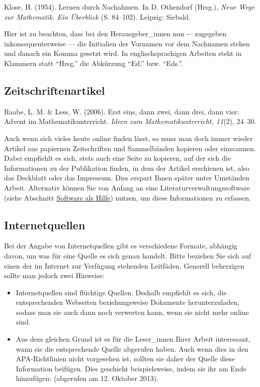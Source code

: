 \documentclass[
  bibliography=totoc,
  oneside,
  12pt,
  a4paper]{scrbook}
\begin{document}
Klose, H. (1954). Lernen durch Nachahmen. In D. Othendorf (Hrsg.), \emph{Neue
Wege zur Mathematik. Ein Überblick} (S. 84--102). Leipzig: Siebald.

Hier ist zu beachten, dass bei den Herausgeber\_innen nun -\/-- zugegeben
inkonsequenterweise --- die Initialien der Vornamen vor dem Nachnamen
stehen und danach ein Komma gesetzt wird. In englischsprachigen Arbeiten
steht in Klammern statt ``Hrsg.'' die Abkürzung ``Ed.'' bzw. ``Eds.''.

\hypertarget{zeitschriftenartikel}{%
\subsection*{Zeitschriftenartikel}\label{zeitschriftenartikel}}

Raabe, L. M. \& Less, W. (2006). Erst eins, dann zwei, dann drei, dann
vier: Advent im Mathematikunterricht. \emph{Ideen zum Mathematikunterricht,
11}(2), 24--30.

Auch wenn sich vieles heute online finden lässt, so muss man doch immer
wieder Artikel aus papiernen Zeitschriften und Sammelbänden kopieren
oder einscannen. Dabei empfiehlt es sich, stets auch eine Seite zu
kopieren, auf der sich die Informationen zu der Publikation finden, in
dem der Artikel erschienen ist, also das Deckblatt oder das Impressum.
Dies erspart Ihnen später unter Umständen Arbeit. Alternativ können Sie
von Anfang an eine Literaturverwaltungssoftware (siehe
Abschnitt \protect\hyperlink{sec:software}{Software als Hilfe}) nutzen, um diese Informationen zu erfassen.

\hypertarget{internetquellen}{%
\subsection*{Internetquellen}\label{internetquellen}}

Bei der Angabe von Internetquellen gibt es verschiedene Formate,
abhängig davon, um was für eine Quelle es sich genau handelt. Bitte
beziehen Sie sich auf einen der im Internet zur Verfügung stehenden
Leitfäden. Generell beherzigen sollte man jedoch zwei Hinweise:

\begin{itemize}
\item
  Internetquellen sind flüchtige Quellen. Deshalb empfiehlt es sich,
  die entsprechenden Webseiten beziehungsweise Dokumente
  herunterzuladen, sodass man sie auch dann noch verwerten kann, wenn
  sie nicht mehr online sind.
\item
  Aus dem gleichen Grund ist es für die Leser\_innen Ihrer Arbeit
  interessant, wann sie die entsprechende Quelle abgerufen haben. Auch
  wenn dies in den APA-Richtlinien nicht vorgesehen ist, sollten sie
  daher der Quelle diese Information beifügen. Dies geschieht
  beispielsweise, indem sie ihr am Ende hinzufügen: (abgerufen am 12.
  Oktober 2013).
\end{itemize}
\end{document}
